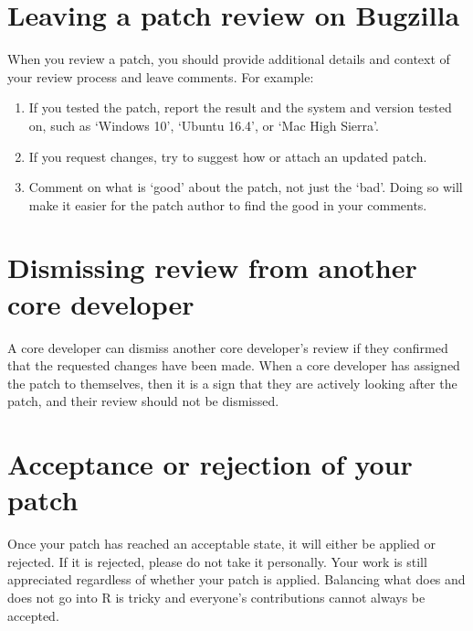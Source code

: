\documentclass[
]{book}
\begin{document}
\hypertarget{leaving-a-patch-review-on-bugzilla}{%
\section{Leaving a patch review on Bugzilla}\label{leaving-a-patch-review-on-bugzilla}}

When you review a patch, you should provide additional details and context of your review process and leave comments. For example:

\begin{enumerate}
\def\labelenumi{\arabic{enumi}.}
\item
  If you tested the patch, report the result and the system and version tested on, such as `Windows 10', `Ubuntu 16.4', or `Mac High Sierra'.
\item
  If you request changes, try to suggest how or attach an updated patch.
\item
  Comment on what is `good' about the patch, not just the `bad'. Doing so will make it easier for the patch author to find the good in your comments.
\end{enumerate}

\hypertarget{dismissing-review-from-another-core-developer}{%
\section{Dismissing review from another core developer}\label{dismissing-review-from-another-core-developer}}

A core developer can dismiss another core developer's review if they confirmed that the requested changes have been made. When a core developer has assigned the patch to themselves, then it is a sign that they are actively looking after the patch, and their review should not be dismissed.

\hypertarget{acceptance-or-rejection-of-your-patch}{%
\section{Acceptance or rejection of your patch}\label{acceptance-or-rejection-of-your-patch}}

Once your patch has reached an acceptable state, it will either be applied or rejected. If it is rejected, please do not take it personally. Your work is still appreciated regardless of whether your patch is applied. Balancing what does and does not go into R is tricky and everyone's contributions cannot always be accepted.
\end{document}

